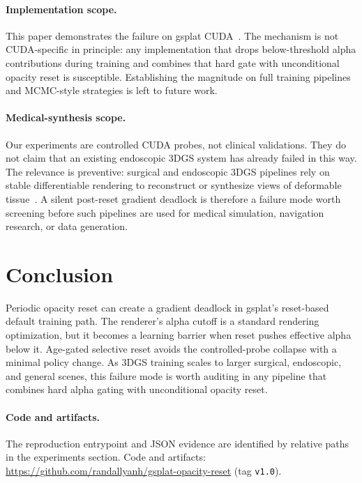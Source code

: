 \documentclass[runningheads]{llncs}
\begin{document}
\paragraph{Implementation scope.} This paper demonstrates the failure on gsplat CUDA~\cite{gsplat2024}. The mechanism is not CUDA-specific in principle: any implementation that drops below-threshold alpha contributions during training and combines that hard gate with unconditional opacity reset is susceptible. Establishing the magnitude on full training pipelines and MCMC-style strategies is left to future work.

\paragraph{Medical-synthesis scope.} Our experiments are controlled CUDA probes, not clinical validations. They do not claim that an existing endoscopic 3DGS system has already failed in this way. The relevance is preventive: surgical and endoscopic 3DGS pipelines rely on stable differentiable rendering to reconstruct or synthesize views of deformable tissue~\cite{endogaussian2024,endogslam2024}. A silent post-reset gradient deadlock is therefore a failure mode worth screening before such pipelines are used for medical simulation, navigation research, or data generation.

\section{Conclusion}

Periodic opacity reset can create a gradient deadlock in gsplat's reset-based default training path. The renderer's alpha cutoff is a standard rendering optimization, but it becomes a learning barrier when reset pushes effective alpha below it. Age-gated selective reset avoids the controlled-probe collapse with a minimal policy change. As 3DGS training scales to larger surgical, endoscopic, and general scenes, this failure mode is worth auditing in any pipeline that combines hard alpha gating with unconditional opacity reset.

\paragraph{Code and artifacts.} The reproduction entrypoint and JSON evidence are identified by relative paths in the experiments section. Code and artifacts: \url{https://github.com/randallyanh/gsplat-opacity-reset} (tag \texttt{v1.0}).
\end{document}
